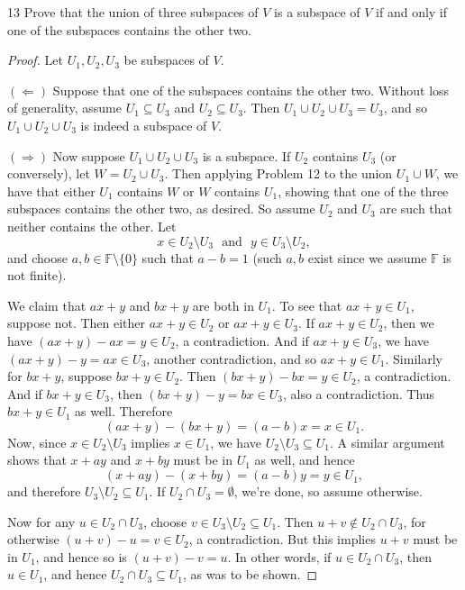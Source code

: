 \documentclass{extarticle}
\newenvironment{problem}[1]{\begin{prob*}{#1}{}}{\end{prob*}}
\newcommand{\F}{\mathbb{F}}
\begin{document}
\begin{problem}{13}
Prove that the union of three subspaces of $V$ is a subspace of $V$ if and only if one of the subspaces contains the other two.
\end{problem}
\begin{proof}
Let $U_1,U_2,U_3$ be subspaces of $V$.
\par $(\Leftarrow)$ Suppose that one of the subspaces contains the other two.  Without loss of generality, assume $U_1\subseteq U_3$ and $U_2\subseteq U_3$.  Then $U_1\cup U_2\cup U_3 = U_3$, and so $U_1\cup U_2\cup U_3$ is indeed a subspace of $V$.
\par $(\Rightarrow)$ Now suppose $U_1\cup U_2\cup U_3$ is a subspace.  If $U_2$ contains $U_3$ (or conversely), let $W = U_2 \cup U_3$.  Then applying Problem 12 to the union $U_1\cup W$, we have that either $U_1$ contains $W$ or $W$ contains $U_1$, showing that one of the three subspaces contains the other two, as desired.  So assume $U_2$ and $U_3$ are such that neither contains the other.  Let
\begin{equation*}
x\in U_2\setminus U_3 ~~~ \text{and} ~~~ y\in U_3\setminus U_2,
\end{equation*} 
and choose $a,b\in\F\setminus\{0\}$ such that $a-b = 1$ (such $a,b$ exist since we assume $\F$ is not finite).  
\par We claim that $ax + y$ and $bx + y$ are both in $U_1$.  To see that $ax + y\in U_1$, suppose not.  Then either $ax + y\in U_2$ or $ax + y\in U_3$.  If $ax + y\in U_2$, then we have $(ax + y) - ax = y\in U_2$, a contradiction.  And if $ax +y \in U_3$, we have $(ax + y) - y = ax \in U_3$, another contradiction, and so $ax+y\in U_1$.  Similarly for $bx + y$, suppose $bx + y\in U_2$.  Then $(bx + y) - bx = y \in U_2$, a contradiction.  And if $bx + y\in U_3$, then $(bx + y) - y = bx \in U_3$, also a contradiction.  Thus $bx + y\in U_1$ as well.  Therefore
\begin{equation*}
(ax + y) - (bx + y) = (a-b)x = x \in U_1. 
\end{equation*}
Now, since $x\in U_2\setminus U_3$ implies $x \in U_1$, we have $U_2\setminus U_3\subseteq U_1$.  A similar argument shows that $x + ay$ and $x + by$ must be in $U_1$ as well, and hence
\begin{equation*}
(x + ay) - (x + by) = (a - b)y = y \in U_1,
\end{equation*}
and therefore $U_3\setminus U_2\subseteq U_1$.   If $U_2\cap U_3=\emptyset$, we're done, so assume otherwise.
\par Now for any $u\in U_2\cap U_3$, choose $v \in U_3\setminus U_2\subseteq U_1$.  Then $u+v\not\in U_2\cap U_3$, for otherwise $(u+v)-u=v\in U_2$, a contradiction.  But this implies $u+v$ must be in $U_1$, and hence so is $(u+v) - v = u$.  In other words, if $u\in U_2\cap U_3$, then $u\in U_1$, and hence $U_2\cap U_3\subseteq U_1$, as was to be shown.
\end{proof}
\end{document}
